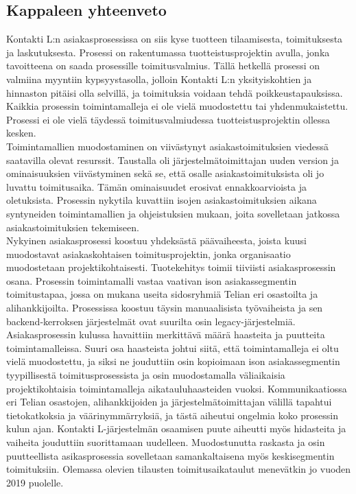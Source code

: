 \documentclass[finnish,12pt,a4paper,pdftex]{article}
\begin{document}
\subsection{Kappaleen yhteenveto}

Kontakti L:n asiakasprosessissa on siis kyse tuotteen tilaamisesta, toimituksesta ja laskutuksesta. Prosessi on rakentumassa tuotteistusprojektin avulla, jonka tavoitteena on saada prosessille toimitusvalmius. Tällä hetkellä prosessi on valmiina myyntiin kypsyystasolla, jolloin Kontakti L:n yksityiskohtien ja hinnaston pitäisi olla selvillä, ja toimituksia voidaan tehdä poikkeustapauksissa. Kaikkia prosessin toimintamalleja ei ole vielä muodostettu tai yhdenmukaistettu. Prosessi ei ole vielä täydessä toimitusvalmiudessa tuotteistusprojektin ollessa kesken.\\

\noindent Toimintamallien muodostaminen on viivästynyt asiakastoimituksien viedessä saatavilla olevat resurssit. Taustalla oli järjestelmätoimittajan uuden version ja ominaisuuksien viivästyminen sekä se, että osalle asiakastoimituksista oli jo luvattu toimitusaika. Tämän ominaisuudet erosivat ennakkoarvioista ja oletuksista. Prosessin nykytila kuvattiin isojen asiakastoimituksien aikana syntyneiden toimintamallien ja ohjeistuksien mukaan, joita sovelletaan jatkossa asiakastoimituksien tekemiseen.\\

Nykyinen asiakasprosessi koostuu yhdeksästä päävaiheesta, joista kuusi muodostavat asiakaskohtaisen toimitusprojektin, jonka organisaatio muodostetaan projektikohtaisesti. Tuotekehitys toimii tiiviisti asiakasprosessin osana. Prosessin toimintamalli vastaa vaativan ison asiakassegmentin toimitustapaa, jossa on mukana useita sidosryhmiä Telian eri osastoilta ja alihankkijoilta. Prosessissa koostuu täysin manuaalisista työvaiheista ja sen backend-kerroksen järjestelmät ovat suurilta osin legacy-järjestelmiä. \\


\noindent Asiakasprosessin kulussa havaittiin merkittävä määrä haasteita ja puutteita toimintamalleissa. Suuri osa haasteista johtui siitä, että toimintamalleja ei oltu vielä muodostettu, ja siksi ne jouduttiin osin kopioimaan ison asiakassegmentin tyypillisestä toimitusprosessista ja osin muodostamalla väliaikaisia projektikohtaisia toimintamalleja aikatauluhaasteiden vuoksi. Kommunikaatiossa eri Telian osastojen, alihankkijoiden ja järjestelmätoimittajan välillä tapahtui tietokatkoksia ja väärinymmärryksiä, ja tästä aiheutui ongelmia koko prosessin kulun ajan. Kontakti L-järjestelmän osaamisen puute aiheutti myös hidasteita ja vaiheita jouduttiin suorittamaan uudelleen. Muodostunutta raskasta ja osin puutteellista asikasprosessia sovelletaan samankaltaisena myös keskisegmentin toimituksiin. Olemassa olevien tilausten toimitusaikataulut menevätkin jo vuoden 2019 puolelle.\\
\end{document}
